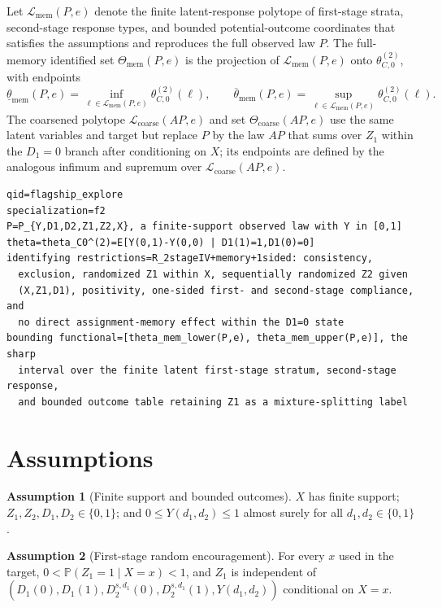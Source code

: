 \documentclass[11pt]{article}
\renewcommand{\Pr}{\mathbb{P}}
\theoremstyle{definition}
\newtheorem{assumption}{Assumption}
\theoremstyle{plain}
\theoremstyle{remark}
\begin{document}
Let \(\mathcal{L}_{\mathrm{mem}}(P,e)\) denote the finite latent-response
polytope of first-stage strata, second-stage response types, and bounded
potential-outcome coordinates that satisfies the assumptions and reproduces
the full observed law \(P\).  The full-memory identified set
\(\Theta_{\mathrm{mem}}(P,e)\) is the projection of
\(\mathcal{L}_{\mathrm{mem}}(P,e)\) onto \(\theta_{C,0}^{(2)}\), with endpoints
\[
\underline\theta_{\mathrm{mem}}(P,e)=\inf_{\ell\in\mathcal{L}_{\mathrm{mem}}(P,e)}
\theta_{C,0}^{(2)}(\ell),\qquad
\overline\theta_{\mathrm{mem}}(P,e)=\sup_{\ell\in\mathcal{L}_{\mathrm{mem}}(P,e)}
\theta_{C,0}^{(2)}(\ell).
\]
The coarsened polytope \(\mathcal{L}_{\mathrm{coarse}}(A P,e)\) and set
\(\Theta_{\mathrm{coarse}}(A P,e)\) use the same latent variables and target but
replace \(P\) by the law \(A P\) that sums over \(Z_1\) within the \(D_1=0\)
branch after conditioning on \(X\); its endpoints are defined by the analogous
infimum and supremum over \(\mathcal{L}_{\mathrm{coarse}}(A P,e)\).

\begin{verbatim}
qid=flagship_explore
specialization=f2
P=P_{Y,D1,D2,Z1,Z2,X}, a finite-support observed law with Y in [0,1]
theta=theta_C0^(2)=E[Y(0,1)-Y(0,0) | D1(1)=1,D1(0)=0]
identifying restrictions=R_2stageIV+memory+1sided: consistency,
  exclusion, randomized Z1 within X, sequentially randomized Z2 given
  (X,Z1,D1), positivity, one-sided first- and second-stage compliance, and
  no direct assignment-memory effect within the D1=0 state
bounding functional=[theta_mem_lower(P,e), theta_mem_upper(P,e)], the sharp
  interval over the finite latent first-stage stratum, second-stage response,
  and bounded outcome table retaining Z1 as a mixture-splitting label
\end{verbatim}

\section{Assumptions}
\begin{assumption}[Finite support and bounded outcomes]\label{ass:finite-bounded}
\(X\) has finite support; \(Z_1,Z_2,D_1,D_2\in\{0,1\}\); and \(0\le Y(d_1,d_2)\le1\) almost surely for all \(d_1,d_2\in\{0,1\}\).
\end{assumption}

\begin{assumption}[First-stage random encouragement]\label{ass:first-rand}
For every \(x\) used in the target, \(0<\Pr(Z_1=1\mid X=x)<1\), and \(Z_1\) is independent of \((D_1(0),D_1(1),D_2^{s,d_1}(0),D_2^{s,d_1}(1),Y(d_1,d_2))\) conditional on \(X=x\).
\end{assumption}
\end{document}
